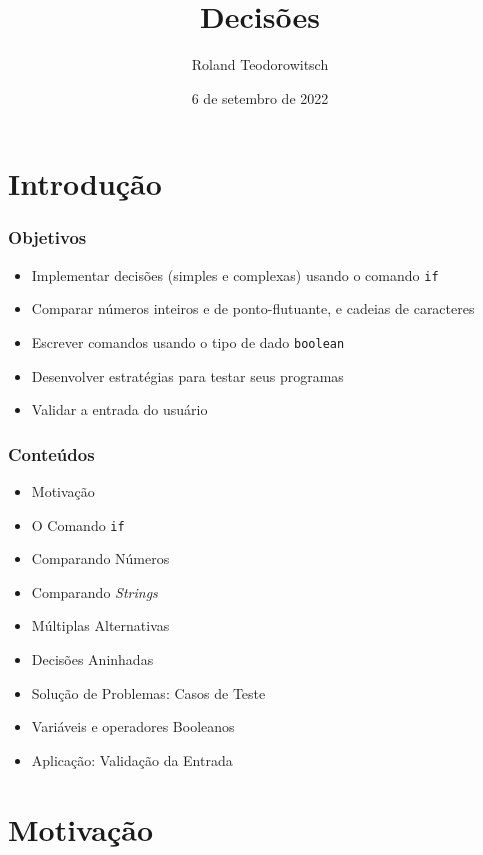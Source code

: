 \documentclass[xcolor={dvipsnames,table},aspectratio=169]{beamer}
\title[\sc{Decisões}]{Decisões}
\author[Roland Teodorowitsch]{Roland Teodorowitsch}
\institute[FPROG - EP - PUCRS]{Fundamentos de Programação - Escola Politécnica - PUCRS}
\date{6 de setembro de 2022}
\begin{document}
\justifying

\begin{frame}
	\titlepage
\end{frame}

\section{Introdução}

\begin{frame}\frametitle{Objetivos}
\begin{itemize}
	\item Implementar decisões (simples e complexas) usando o comando \texttt{if}
	\item Comparar números inteiros e de ponto-flutuante, e cadeias de caracteres
	\item Escrever comandos usando o tipo de dado \texttt{boolean}
	\item Desenvolver estratégias para testar seus programas
	\item Validar a entrada do usuário
\end{itemize}
\end{frame}

\begin{frame}\frametitle{Conteúdos}
\begin{itemize}
	\item Motivação
	\item O Comando \texttt{if}
	\item Comparando Números
	\item Comparando \emph{Strings}
	\item Múltiplas Alternativas
	\item Decisões Aninhadas
	\item Solução de Problemas: Casos de Teste
	\item Variáveis e operadores Booleanos
	\item Aplicação: Validação da Entrada
\end{itemize}
\end{frame}

\section{Motivação}
\end{document}
